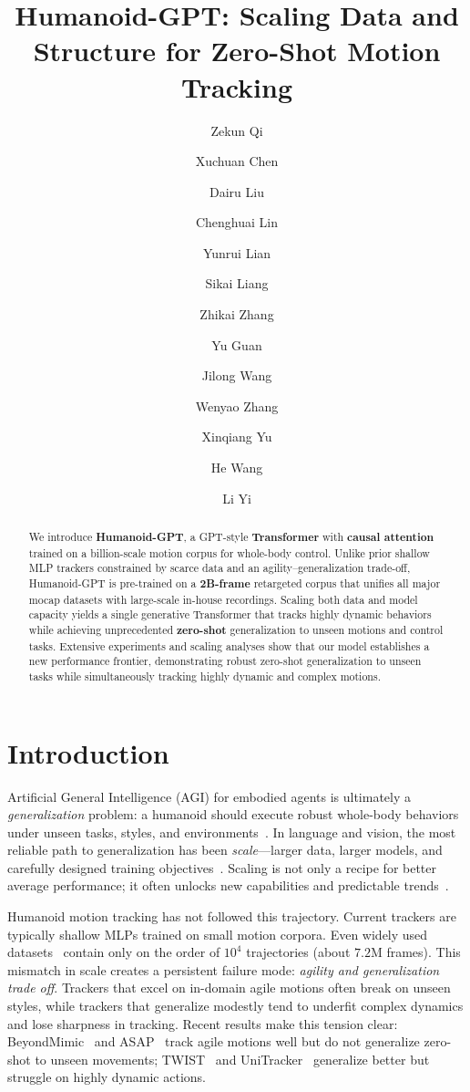 \documentclass{llmxive}
\title{Humanoid-GPT: Scaling Data and Structure for Zero-Shot Motion Tracking}
\author{Zekun Qi \and Xuchuan Chen \and Dairu Liu \and Chenghuai Lin \and Yunrui Lian \and Sikai Liang \and Zhikai Zhang \and Yu Guan \and Jilong Wang \and Wenyao Zhang \and Xinqiang Yu \and He Wang \and Li Yi}
\begin{document}
\maketitle
\begin{abstract}
We introduce \textbf{Humanoid-GPT}, a GPT-style \textbf{Transformer} with \textbf{causal attention} trained
on a billion-scale motion corpus for whole-body control. Unlike prior shallow MLP trackers constrained by scarce data and an agility–generalization trade-off, Humanoid-GPT is pre-trained on a \textbf{2B-frame} retargeted corpus that unifies all major mocap datasets with large-scale in-house recordings. Scaling both data and model capacity yields a single generative Transformer that tracks highly dynamic behaviors while achieving unprecedented \textbf{zero-shot} generalization to unseen motions and control tasks. Extensive experiments and scaling analyses show that our model establishes a new performance frontier, demonstrating robust zero-shot generalization to unseen tasks while simultaneously tracking highly dynamic and complex motions.
\end{abstract}
% 



\section{Introduction}
\label{sec:intro}

Artificial General Intelligence (AGI) for embodied agents is ultimately a \emph{generalization} problem: a humanoid should execute robust whole-body behaviors under unseen tasks, styles, and environments~\cite{ChatGPT22,GPT3_20,GPT4o24,gpt_o1}. In language and vision, the most reliable path to generalization has been \emph{scale}---larger data, larger models, and carefully designed training objectives~\cite{ChatGPT22,InstructGPT22,gemini23,gpt_o1,LLaMA23,CLIP21,SAM23}. Scaling is not only a recipe for better average performance; it often unlocks new capabilities and predictable trends~\cite{emergent22}.

Humanoid motion tracking has not followed this trajectory. Current trackers are typically shallow MLPs trained on small motion corpora. Even widely used datasets~\cite{amass19,lafan20,omomo23} contain only on the order of $10^4$ trajectories (about $7.2$M frames). This mismatch in scale creates a persistent failure mode: \emph{agility and generalization trade off}. Trackers that excel on in-domain agile motions often break on unseen styles, while trackers that generalize modestly tend to underfit complex dynamics and lose sharpness in tracking. Recent results make this tension clear: BeyondMimic~\cite{beyondmimic25} and ASAP~\cite{asap25} track agile motions well but do not generalize zero-shot to unseen movements; TWIST~\cite{twist25} and UniTracker~\cite{unitracker25} generalize better but struggle on highly dynamic actions.
\end{document}
